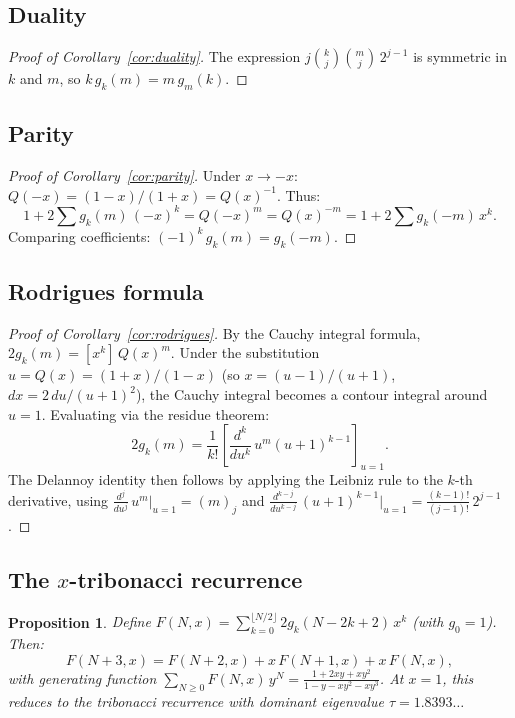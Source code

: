 \documentclass[11pt]{amsart}
\newtheorem{proposition}[theorem]{Proposition}
\theoremstyle{definition}
\begin{document}
\subsection{Duality}

\begin{proof}[Proof of Corollary~\ref{cor:duality}]
The expression $j\binom{k}{j}\binom{m}{j}\, 2^{j-1}$ is symmetric in $k$ and $m$, so $k\, g_k(m) = m\, g_m(k)$.
\end{proof}

\subsection{Parity}

\begin{proof}[Proof of Corollary~\ref{cor:parity}]
Under $x \to -x$: $Q(-x) = (1-x)/(1+x) = Q(x)^{-1}$. Thus:
\[
1 + 2\sum g_k(m)\,(-x)^k = Q(-x)^m = Q(x)^{-m} = 1 + 2\sum g_k(-m)\, x^k.
\]
Comparing coefficients: $(-1)^k\, g_k(m) = g_k(-m)$.
\end{proof}

\subsection{Rodrigues formula}

\begin{proof}[Proof of Corollary~\ref{cor:rodrigues}]
By the Cauchy integral formula, $2g_k(m) = [x^k]\, Q(x)^m$. Under the substitution $u = Q(x) = (1+x)/(1-x)$ (so $x = (u-1)/(u+1)$, $dx = 2\,du/(u+1)^2$), the Cauchy integral becomes a contour integral around $u=1$. Evaluating via the residue theorem:
\[
2g_k(m) = \frac{1}{k!}\left[\frac{d^k}{du^k}\, u^m(u+1)^{k-1}\right]_{u=1}.
\]
The Delannoy identity then follows by applying the Leibniz rule to the $k$-th derivative, using $\frac{d^j}{du^j}\, u^m\big|_{u=1} = (m)_j$ and $\frac{d^{k-j}}{du^{k-j}}\,(u+1)^{k-1}\big|_{u=1} = \frac{(k-1)!}{(j-1)!}\, 2^{j-1}$.
\end{proof}

\subsection{The $x$-tribonacci recurrence}

\begin{proposition}\label{prop:tribonacci}
Define $F(N,x) = \sum_{k=0}^{\lfloor N/2 \rfloor} 2g_k(N-2k+2)\, x^k$ (with $g_0 = 1$). Then:
\[
F(N+3,x) = F(N+2,x) + x\, F(N+1,x) + x\, F(N,x),
\]
with generating function $\sum_{N \geq 0} F(N,x)\, y^N = \frac{1+2xy+xy^2}{1-y-xy^2-xy^3}$.
At $x = 1$, this reduces to the tribonacci recurrence with dominant eigenvalue $\tau = 1.8393\ldots$
\end{proposition}
\end{document}
